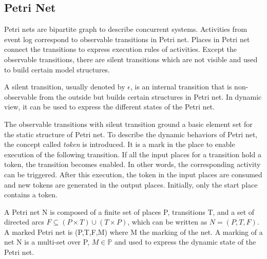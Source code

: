 \subsection{Petri Net}
Petri nets are bipartite graph to describe concurrent systems. Activities from event log correspond to observable transitions in Petri net. Places in Petri net connect the transitions to express execution rules of activities. Except the observable transitions, there are silent transitions which are not visible and used to build certain model structures. 
\begin{definition}
	A silent transition, usually denoted by $\epsilon$, is an internal transition that is non-observable from the outside but builds certain structures in Petri net. In dynamic view, it can be used to express the different states of the Petri net. 
\end{definition}
The observable transitions with silent transition ground a basic element set for the static structure of Petri net. To describe the dynamic behaviors of Petri net, the concept called \emph{token} is introduced. It is a mark in the place to enable execution of the following transition. If all the input places for a transition hold a token, the transition becomes enabled. In other words, the corresponding activity can be triggered. After this execution, the token in the input places are consumed and new tokens are generated in the output places. Initially, only the start place contains a token. 
\begin{definition}
	A Petri net N is composed of a finite set of places P, transitions T, and a set of directed arcs $F \subseteq (P \times T) \cup (T \times P)$, which can be written as $N=(P,T,F)$. A marked Petri net is (P,T,F,M) where M the marking of the net. A marking of a net N is a multi-set over P, $M \in \mathbb{P} $ and used to express the dynamic state of the Petri net.
\end{definition}

